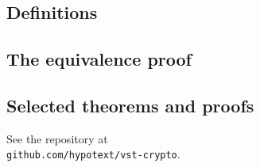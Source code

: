 \documentclass[twocolumn,showpacs,%
  nofootinbib,aps,superscriptaddress,%
  eqsecnum,prd,notitlepage,showkeys,10pt]{revtex4-1}
\begin{document}


\subsection{Definitions}







\subsection{The equivalence proof}



\subsection{Selected theorems and proofs}

See the repository at \\ \verb|github.com/hypotext/vst-crypto|.
\end{document}
